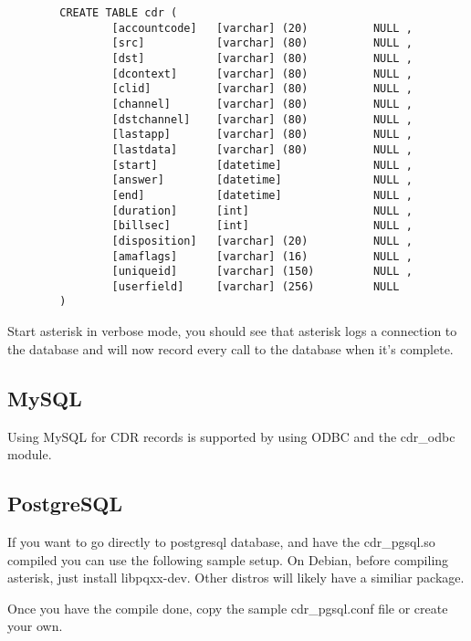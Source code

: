 \begin{astlisting}
\begin{verbatim}
		CREATE TABLE cdr (
		        [accountcode]   [varchar] (20)          NULL ,
		        [src]           [varchar] (80)          NULL ,
		        [dst]           [varchar] (80)          NULL ,
		        [dcontext]      [varchar] (80)          NULL ,
		        [clid]          [varchar] (80)          NULL ,
		        [channel]       [varchar] (80)          NULL ,
		        [dstchannel]    [varchar] (80)          NULL ,
		        [lastapp]       [varchar] (80)          NULL ,
		        [lastdata]      [varchar] (80)          NULL ,
		        [start]         [datetime]              NULL ,
		        [answer]        [datetime]              NULL ,
		        [end]           [datetime]              NULL ,
		        [duration]      [int]                   NULL ,
		        [billsec]       [int]                   NULL ,
		        [disposition]   [varchar] (20)          NULL ,
		        [amaflags]      [varchar] (16)          NULL ,
		        [uniqueid]      [varchar] (150)         NULL ,
		        [userfield]     [varchar] (256)         NULL
		)
\end{verbatim}
\end{astlisting}
                Start asterisk in verbose mode, you should see that asterisk
                logs a connection to the database and will now record every
                call to the database when it's complete.


\subsection{MySQL}

Using MySQL for CDR records is supported by using ODBC and the cdr\_odbc module.

\subsection{PostgreSQL}
        If you want to go directly to postgresql database, and have the cdr\_pgsql.so
        compiled you can use the following sample setup.
        On Debian, before compiling asterisk, just install libpqxx-dev.
        Other distros will likely have a similiar package.

        Once you have the compile done,
        copy the sample cdr\_pgsql.conf file or create your own.

